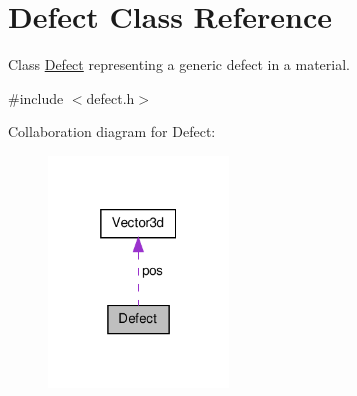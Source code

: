 \hypertarget{classDefect}{\section{\-Defect \-Class \-Reference}
\label{d5/d4f/classDefect}
}


\-Class \hyperlink{classDefect}{\-Defect} representing a generic defect in a material.  




{\ttfamily \#include $<$defect.\-h$>$}



\-Collaboration diagram for \-Defect\-:\nopagebreak
\begin{figure}[H]
\begin{center}
\leavevmode
\includegraphics[width=136pt]{d7/d09/classDefect__coll__graph}
\end{center}
\end{figure}
